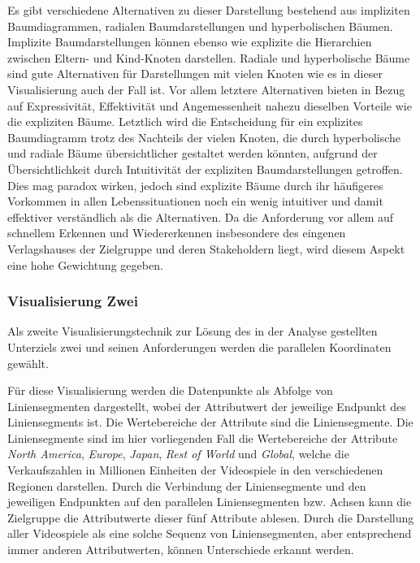 \documentclass[usegeometry=true]{scrartcl}
\begin{document}
Es gibt verschiedene Alternativen zu dieser Darstellung bestehend aus impliziten Baumdiagrammen, radialen Baumdarstellungen und hyperbolischen Bäumen. 
Implizite Baumdarstellungen können ebenso wie explizite die Hierarchien zwischen Eltern- und Kind-Knoten darstellen. 
Radiale und hyperbolische Bäume sind gute Alternativen für Darstellungen mit vielen Knoten wie es in dieser Visualisierung auch der Fall ist. 
Vor allem letztere Alternativen bieten in Bezug auf Expressivität, Effektivität und Angemessenheit nahezu dieselben Vorteile wie die expliziten Bäume. 
Letztlich wird die Entscheidung für ein explizites Baumdiagramm trotz des Nachteils der vielen Knoten, die durch hyperbolische und radiale Bäume übersichtlicher gestaltet werden könnten, aufgrund der Übersichtlichkeit durch Intuitivität der expliziten Baumdarstellungen getroffen. 
Dies mag paradox wirken, jedoch sind explizite Bäume durch ihr häufigeres Vorkommen in allen Lebenssituationen noch ein wenig intuitiver und damit effektiver verständlich als die Alternativen. 
Da die Anforderung vor allem auf schnellem Erkennen und Wiedererkennen insbesondere des eingenen Verlagshauses der Zielgruppe und deren Stakeholdern liegt, wird diesem Aspekt eine hohe Gewichtung gegeben.

\subsubsection{Visualisierung Zwei}
Als zweite Visualisierungstechnik zur Lösung des in der Analyse gestellten Unterziels zwei und seinen Anforderungen werden die parallelen Koordinaten gewählt.

Für diese Visualisierung werden die Datenpunkte als Abfolge von Liniensegmenten dargestellt, wobei der Attributwert der jeweilige Endpunkt des Liniensegments ist. 
Die Wertebereiche der Attribute sind die Liniensegmente.
Die Liniensegmente sind im hier vorliegenden Fall die Wertebereiche der Attribute \textit{North America}, \textit{Europe}, \textit{Japan}, \textit{Rest of World} und \textit{Global}, welche die Verkaufszahlen in Millionen Einheiten der Videospiele in den verschiedenen Regionen darstellen.
Durch die Verbindung der Liniensegmente und den jeweiligen Endpunkten auf den parallelen Liniensegmenten bzw. Achsen kann die Zielgruppe die Attributwerte dieser fünf Attribute ablesen. 
Durch die Darstellung aller Videospiele als eine solche Sequenz von Liniensegmenten, aber entsprechend immer anderen Attributwerten, können Unterschiede erkannt werden. 
\end{document}
